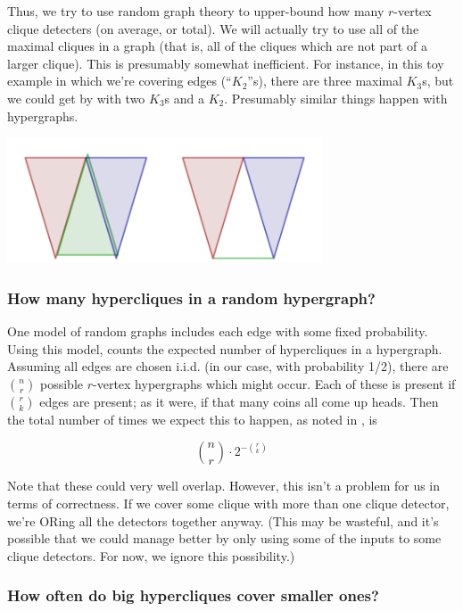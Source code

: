 \documentclass[12pt]{article}
\theoremstyle{definition}
\begin{document}
Thus, we try to use random graph theory to upper-bound how many
$r$-vertex clique detecters (on average, or total). We will actually
try to use all of the maximal cliques in a graph (that is, all of the
cliques which are not part of a larger clique). This is presumably
somewhat inefficient.
For instance, in this toy example in which we're covering edges
(``$K_2$''s), there
are three maximal $K_3$s, but we could get by with two $K_3$s and
a $K_2$. Presumably similar things happen with hypergraphs.

\includegraphics[width=0.7\textwidth]{R/maximal.pdf}


\subsubsection{How many hypercliques in a random hypergraph?}

One model of random graphs
includes each edge with some fixed probability. Using this model,
\cite{bollobas1976cliques}
counts the expected number of hypercliques in a hypergraph. Assuming all
edges are chosen i.i.d. (in our case, with probability 1/2),
there are ${n \choose r}$ possible $r$-vertex hypergraphs which might
occur. Each of these is present if ${r \choose k}$ edges are present; as it
were, if that many coins all come up heads. Then the total number of times
we expect this to happen, as noted in \cite{bollobas1976cliques}, is

\[
{n \choose r} \cdot 2^{-{r \choose k}}
\]

Note that these could very well overlap. However, this isn't a problem for
us in terms of correctness. If we cover some clique
with more than one
clique detector, we're
ORing all the detectors together anyway. (This may be wasteful, and it's
possible that we could manage better by only using some of the inputs to
some clique detectors. For now, we ignore this possibility.)

\subsubsection{How often do big hypercliques cover smaller ones?}
\end{document}
